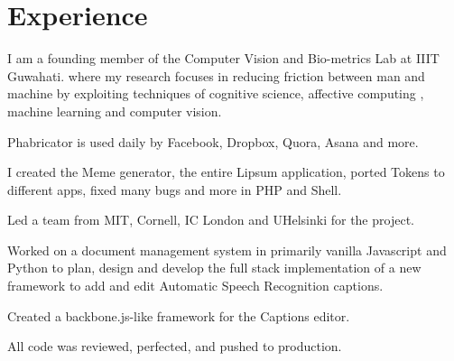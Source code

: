 

\section{Experience}
I am a founding member of the Computer Vision and Bio-metrics Lab at IIIT Guwahati. where my research focuses in reducing friction between man and machine by exploiting techniques of cognitive science, affective computing , machine learning and computer vision.
\sectionsep

\begin{tightemize}
\item Phabricator is used daily by Facebook, Dropbox, Quora, Asana and more.\item I created the Meme generator, the entire Lipsum application, ported Tokens to different apps, fixed many bugs and more in PHP and Shell.\item Led a team from MIT, Cornell, IC London and UHelsinki for the project.\end{tightemize}
\sectionsep

\begin{tightemize}
\item Worked on a document management system in primarily vanilla Javascript and Python to plan, design and develop the full stack implementation of a new framework to add and edit Automatic Speech Recognition captions.\item Created a backbone.js-like framework for the Captions editor.\item All code was reviewed, perfected, and pushed to production.\end{tightemize}
\sectionsep